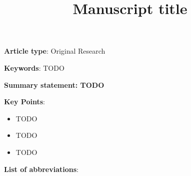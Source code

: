 \documentclass[11pt]{article}
\title{Manuscript title}
\begin{document}
\maketitle


\textbf{Article type}: Original Research

\textbf{Keywords}: TODO

\textbf{Summary statement: TODO}

\textbf{Key Points}:
\begin{itemize}
    \item TODO
    \item TODO
    \item TODO
\end{itemize}


\textbf{List of abbreviations}:
\printglossary[
  type=\acronymtype,
  title={},      %
  toctitle={},   %
  nonumberlist,  %
  nopostdot      %
  ]

\clearpage
\end{document}
